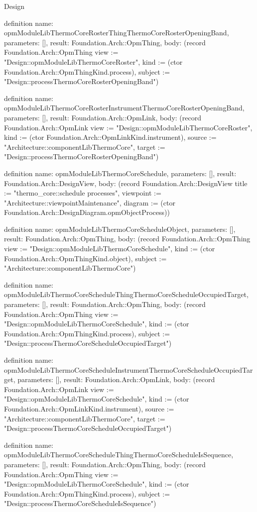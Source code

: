 \begin{lexlean}{Design}
\begin{semanticmodule}
definition{
  name: opmModuleLibThermoCoreRosterThingThermoCoreRosterOpeningBand,
  parameters: [],
  result: Foundation.Arch::OpmThing,
  body: (record Foundation.Arch::OpmThing {view := "Design::opmModuleLibThermoCoreRoster", kind := (ctor Foundation.Arch::OpmThingKind.process), subject := "Design::processThermoCoreRosterOpeningBand"})
}

definition{
  name: opmModuleLibThermoCoreRosterInstrumentThermoCoreRosterOpeningBand,
  parameters: [],
  result: Foundation.Arch::OpmLink,
  body: (record Foundation.Arch::OpmLink {view := "Design::opmModuleLibThermoCoreRoster", kind := (ctor Foundation.Arch::OpmLinkKind.instrument), source := "Architecture::componentLibThermoCore", target := "Design::processThermoCoreRosterOpeningBand"})
}

definition{
  name: opmModuleLibThermoCoreSchedule,
  parameters: [],
  result: Foundation.Arch::DesignView,
  body: (record Foundation.Arch::DesignView {title := "thermo_core::schedule processes", viewpoint := "Architecture::viewpointMaintenance", diagram := (ctor Foundation.Arch::DesignDiagram.opmObjectProcess)})
}

definition{
  name: opmModuleLibThermoCoreScheduleObject,
  parameters: [],
  result: Foundation.Arch::OpmThing,
  body: (record Foundation.Arch::OpmThing {view := "Design::opmModuleLibThermoCoreSchedule", kind := (ctor Foundation.Arch::OpmThingKind.object), subject := "Architecture::componentLibThermoCore"})
}

definition{
  name: opmModuleLibThermoCoreScheduleThingThermoCoreScheduleOccupiedTarget,
  parameters: [],
  result: Foundation.Arch::OpmThing,
  body: (record Foundation.Arch::OpmThing {view := "Design::opmModuleLibThermoCoreSchedule", kind := (ctor Foundation.Arch::OpmThingKind.process), subject := "Design::processThermoCoreScheduleOccupiedTarget"})
}

definition{
  name: opmModuleLibThermoCoreScheduleInstrumentThermoCoreScheduleOccupiedTarget,
  parameters: [],
  result: Foundation.Arch::OpmLink,
  body: (record Foundation.Arch::OpmLink {view := "Design::opmModuleLibThermoCoreSchedule", kind := (ctor Foundation.Arch::OpmLinkKind.instrument), source := "Architecture::componentLibThermoCore", target := "Design::processThermoCoreScheduleOccupiedTarget"})
}

definition{
  name: opmModuleLibThermoCoreScheduleThingThermoCoreScheduleIsSequence,
  parameters: [],
  result: Foundation.Arch::OpmThing,
  body: (record Foundation.Arch::OpmThing {view := "Design::opmModuleLibThermoCoreSchedule", kind := (ctor Foundation.Arch::OpmThingKind.process), subject := "Design::processThermoCoreScheduleIsSequence"})
}


\end{semanticmodule}
\end{lexlean}
